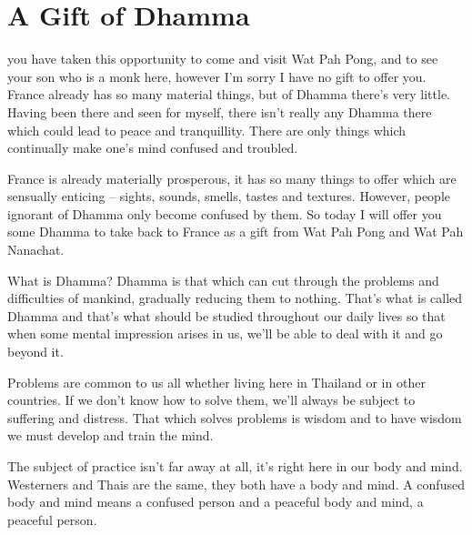 
\chapter{A Gift of Dhamma}

\vspace*{1.5\baselineskip}
  you have taken this opportunity to come and visit Wat Pah Pong, and to see your son who is a monk here, however I'm sorry I have no gift to offer you. France already has so many material things, but of Dhamma there's very little. Having been there and seen for myself, there isn't really any Dhamma there which could lead to peace and tranquillity. There are only things which continually make one's mind confused and troubled. 

 France is already materially prosperous, it has so many things to offer which are sensually enticing -- sights, sounds, smells, tastes and textures. However, people ignorant of Dhamma only become confused by them. So today I will offer you some Dhamma to take back to France as a gift from Wat Pah Pong and Wat Pah Nanachat. 

 What is Dhamma? Dhamma is that which can cut through the problems and difficulties of mankind, gradually reducing them to nothing. That's what is called Dhamma and that's what should be studied throughout our daily lives so that when some mental impression arises in us, we'll be able to deal with it and go beyond it. 

 Problems are common to us all whether living here in Thailand or in other countries. If we don't know how to solve them, we'll always be subject to suffering and distress. That which solves problems is wisdom and to have wisdom we must develop and train the mind. 

 The subject of practice isn't far away at all, it's right here in our body and mind. Westerners and Thais are the same, they both have a body and mind. A confused body and mind means a confused person and a peaceful body and mind, a peaceful person. 

